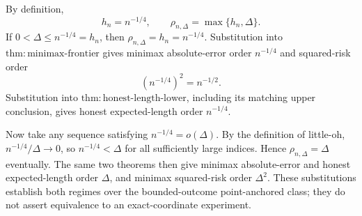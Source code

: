 By definition,
\[
 h_n=n^{-1/4},
 \qquad
 \rho_{n,\Delta}=\max\{h_n,\Delta\}.
\]
If \(0<\Delta\leq n^{-1/4}=h_n\), then \(\rho_{n,\Delta}=h_n=n^{-1/4}\).  Substitution into \(\mathrm{thm:minimax\text{-}frontier}\) gives minimax absolute-error order \(n^{-1/4}\) and squared-risk order
\[
 (n^{-1/4})^2=n^{-1/2}.
\]
Substitution into \(\mathrm{thm:honest\text{-}length\text{-}lower}\), including its matching upper conclusion, gives honest expected-length order \(n^{-1/4}\).

Now take any sequence satisfying \(n^{-1/4}=o(\Delta)\).  By the definition of little-oh, \(n^{-1/4}/\Delta\to0\), so \(n^{-1/4}<\Delta\) for all sufficiently large indices.  Hence \(\rho_{n,\Delta}=\Delta\) eventually.  The same two theorems then give minimax absolute-error and honest expected-length order \(\Delta\), and minimax squared-risk order \(\Delta^2\).  These substitutions establish both regimes over the bounded-outcome point-anchored class; they do not assert equivalence to an exact-coordinate experiment.